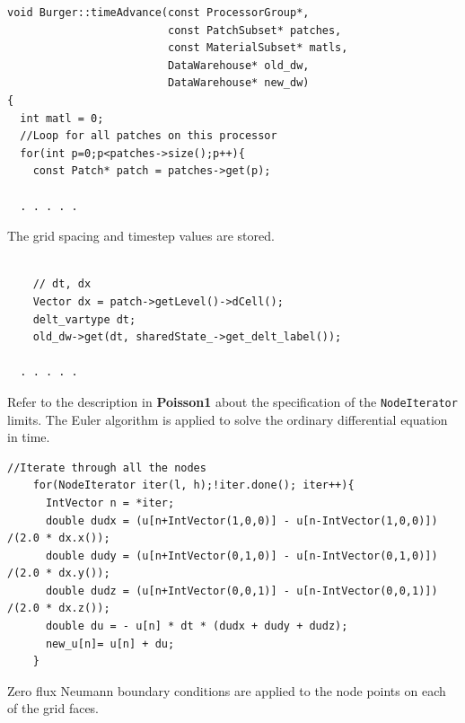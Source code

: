\documentclass[12pt]{report}
\begin{document}
\begin{Verbatim}[fontsize=\footnotesize]
void Burger::timeAdvance(const ProcessorGroup*,
                         const PatchSubset* patches,
                         const MaterialSubset* matls,
                         DataWarehouse* old_dw, 
                         DataWarehouse* new_dw)
{
  int matl = 0;
  //Loop for all patches on this processor
  for(int p=0;p<patches->size();p++){
    const Patch* patch = patches->get(p);
    
  . . . . .
\end{Verbatim}

The grid spacing and timestep values are stored.

\begin{Verbatim}[fontsize=\footnotesize]

    // dt, dx
    Vector dx = patch->getLevel()->dCell();
    delt_vartype dt;
    old_dw->get(dt, sharedState_->get_delt_label());
    
  . . . . .  
\end{Verbatim}

Refer to the description in \textbf{Poisson1} about the specification
of the \texttt{NodeIterator} limits.  The Euler algorithm is applied to solve
the ordinary differential equation in time.

\begin{Verbatim}[fontsize=\footnotesize]                   
    //Iterate through all the nodes
    for(NodeIterator iter(l, h);!iter.done(); iter++){    
      IntVector n = *iter;
      double dudx = (u[n+IntVector(1,0,0)] - u[n-IntVector(1,0,0)]) /(2.0 * dx.x());
      double dudy = (u[n+IntVector(0,1,0)] - u[n-IntVector(0,1,0)]) /(2.0 * dx.y());
      double dudz = (u[n+IntVector(0,0,1)] - u[n-IntVector(0,0,1)]) /(2.0 * dx.z());
      double du = - u[n] * dt * (dudx + dudy + dudz);
      new_u[n]= u[n] + du;
    }

\end{Verbatim}

Zero flux Neumann boundary conditions are applied to the node points
on each of the grid faces.
\end{document}
